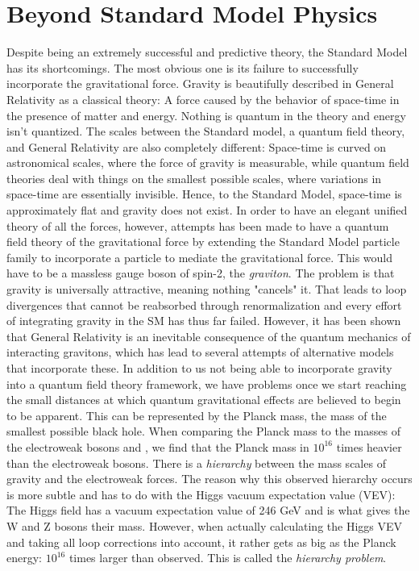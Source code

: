 \section{Beyond Standard Model Physics}
Despite being an extremely successful and predictive theory, the Standard Model has its shortcomings. The most obvious one is its failure to successfully incorporate the gravitational force. Gravity is beautifully described in General Relativity as a classical theory: A force caused by the behavior of space-time in the presence of matter and energy. Nothing is quantum in the theory and energy isn't quantized.
The scales between the Standard model, a quantum field theory, and General Relativity are also completely different: Space-time is curved on astronomical scales, where the force of gravity is measurable, while quantum field theories deal with things on the smallest possible scales, where variations in space-time are essentially invisible. Hence, to the Standard Model, space-time is approximately flat and gravity does not exist. In order to have an elegant unified theory of all the forces, however, attempts has been made to have a quantum field theory of the gravitational force by extending the Standard Model particle family to incorporate a particle to mediate the gravitational force. This would have to be a massless gauge boson of spin-2, the \emph{graviton}. The problem is that gravity is universally attractive, meaning nothing "cancels" it. That leads to loop divergences that cannot be reabsorbed through renormalization and every effort of integrating gravity in the SM has thus far failed. However, it has been shown that General Relativity is an inevitable consequence of the quantum mechanics of interacting gravitons, which has lead to several attempts of alternative models that incorporate these.\newline
In addition to us not being able to incorporate gravity into a quantum field theory framework, we have problems once we start reaching the small distances at which quantum gravitational effects are believed to begin to be apparent. This can be represented by the Planck mass, the mass of the smallest possible black hole. When comparing the Planck mass to the masses of the electroweak bosons \PW and \PZ, we find that the Planck mass in $10^{16}$ times heavier than the electroweak bosons. There is a \emph{hierarchy} between the mass scales of gravity and the electroweak forces. The reason why this observed hierarchy occurs is more subtle and has to do with the Higgs vacuum expectation value (VEV): The Higgs field has a vacuum expectation value of 246 GeV and is what gives the W and Z bosons their mass. However, when actually calculating the Higgs VEV and taking all loop corrections into account, it rather gets as big as the Planck energy: $10^{16}$ times larger than observed. This is called the \emph{hierarchy problem}.
